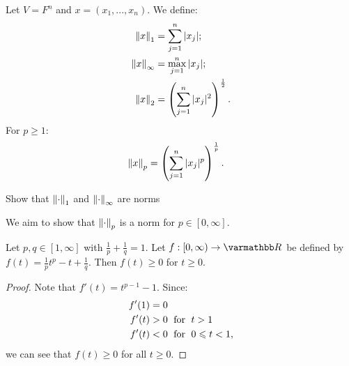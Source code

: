     \begin{example}
        Let $V = F^n$ and $x = (x_1,...,x_n)$. We define:
            \begin{equation*}
            \begin{split}
                \left\lVert x \right\rVert_1 &= \sum_{j  =1}^n |x_j|; \\
                \left\lVert x \right\rVert_\infty & = \max_{j=1}^n |x_j|; \\
                \left\lVert x \right\rVert_2 & = \left( \sum_{j = 1}^n |x_j|^2 \right)^{\frac{1}{2}}.
            \end{split}
            \end{equation*}
        For $p \geq 1$:
            \begin{equation*}
            \begin{split}
                \left\lVert x \right\rVert_p & = \left( \sum_{j = 1}^n |x_j|^p \right)^\frac{1}{p}.
            \end{split}
            \end{equation*}
    \end{example}

    \begin{exercise}
        Show that $\left\lVert \cdot \right\rVert_1$ and $\left\lVert \cdot \right\rVert_\infty$ are norms 
    \end{exercise}

    \begin{center}
    \end{center}

    We aim to show that $\left\lVert \cdot \right\rVert_p$ is a norm for $p \in [0,\infty]$.

    \begin{lemma}\label{lemma:lemnorm1}
        Let $p,q \in [1,\infty]$ with $\frac{1}{p} + \frac{1}{q} = 1$. Let $f:[0,\infty) \rightarrow \bfR$ be defined by $f(t) = \frac{1}{p}t^p - t + \frac{1}{q}$. Then $f(t) \geq 0$ for $t \geq 0$.
    \end{lemma}
        \begin{proof}
            Note that $f'(t) = t^{p-1} - 1$. Since:
                \begin{equation*}
                \begin{split}
                    f'(1) &= 0 \\
                    f'(t) &> 0 \hspace{6pt}\text{for}\hspace{6pt} t>1 \\
                    f'(t) &<0 \hspace{6pt}\text{for}\hspace{6pt} 0\leqslant t < 1,
                \end{split}
                \end{equation*}
            we can see that $f(t) \geq 0$ for all $t \geq 0$.
        \end{proof}

